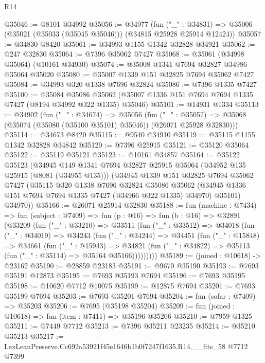 \begin{lexlean}{R14}
\begin{coremodule}
@35046 := @8101 @34992
@35056 := @34977
    (fun ("_" : @34831) => @35006 (@35021 (@35033 (@35045 @35046))) (@34815 @25928 @25914 @12424))
@35057 := @34830 @8420
@35061 := @34993 @1155 @1342 @32828 @34921
@35062 := @247 @32830
@35064 := @7396 @35062 @7427
@35068 := @35061 (@34998 @35064) (@10161 @34930)
@35074 := @35008 @1341 @7694 @32827 @34986 @35064 @35020
@35080 := @35007 @1339 @151 @32825 @7694 @35062 @7427
@35084 := @34993 @320 @1338 @7696 @32824
@35086 := @7396 @1335 @7427
@35100 := @35084
    @35086
    @35062
    (@35007 @1336 @151 @7694 @7694 @1335 @7427 (@8194 @34992 @322 @1335) @35046)
@35101 := @14931 @1334
@35113 := @34902
    (fun ("_" : @34674) =>
    @35056
      (fun ("_" : @35057) =>
      @35068 (@35074 (@35080 (@35100 @35101) @35046)) (@26071 @25928 @32830)))
@35114 := @34673 @8420
@35115 := @9540 @34910
@35119 := @35115 @1155 @1342 @32828 @34842
@35120 := @7396 @25915
@35121 := @35120 @35064
@35122 := @35119 @35121
@35123 := @10161 @34857
@35164 := @35122
    @35123
    (@34945
      @149
      @1341
      @7694
      @32827
      @25915
      @35064
      (@34952 @135 @25915 (@8081 (@34955 @135)))
      (@34945
        @1339
        @151
        @32825
        @7694
        @35062
        @7427
        (@35115
          @320
          @1338
          @7696
          @32824
          @35086
          @35062
          (@34945 @1336 @151 @7694 @7694 @1335 @7427 (@34966 @322 @1335) @34970)
          @35101)
        @34970))
@35166 := @26071 @25914 @32830
@35188 := fun (machine : @7434) =>
  fun (subject : @7409) =>
  fun (p : @16) =>
  fun (b : @16) =>
  @32891
    (@33209
      (fun ("_" : @33210) =>
      @33511
        (fun ("_" : @33512) =>
        @34018
          (fun ("_" : @34019) =>
          @34243
            (fun ("_" : @34244) =>
            @34451
              (fun ("_" : @15848) =>
              @34661
                (fun ("_" : @15943) =>
                @34821 (fun ("_" : @34822) => @35113 (fun ("_" : @35114) => @35164 @35166)))))))))
@35189 := (joined : @10618) -> @23162
@35190 := @28859 @23183
@35191 := @9670 @35190
@35193 := @7693 @35191 @12873
@35195 := @7693 @35193 @7694
@35196 := @7693 @35195
@35198 := @10620 @7712 @10075
@35199 := @12875 @7694
@35201 := @7693 @35199 @7694
@35203 := @7693 @35201 @7694
@35204 := fun (sofar : @7409) => @35203
@35206 := @7695 (@35198 @35204)
@35209 := fun (joined : @10618) => fun (item : @7411) => @35196 @35206
@35210 := @7959 @1325
@35211 := @7449 @7712
@35213 := @7396 @35211 @23235
@35214 := @35210 @35213
@35217 := LexLeanPreserve.Cc692a53921f45e1646b1b0f7247f1635.R14.__fits_58 @7712 @7399

\end{coremodule}
\end{lexlean}
